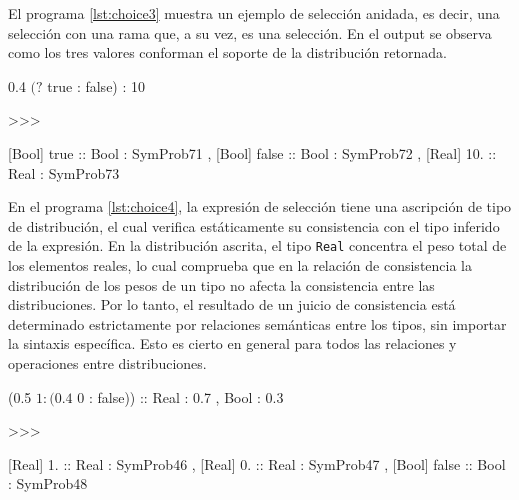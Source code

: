   




El programa \ref{lst:choice3} muestra un ejemplo de selección anidada,
es decir, una selección con una rama que, a su vez,
es una selección. En el output se observa como los
tres valores conforman el soporte de la distribución
retornada.

\begin{gplcblock}[caption={Selección anidada},label={lst:choice3}]
0.4 $ (? $ true : false) : 10

>>>

{
	 [Bool] true :: Bool : SymProb71 ,
	 [Bool] false :: Bool : SymProb72 ,
	 [Real] 10. :: Real : SymProb73 
}  
\end{gplcblock}



En el programa \ref{lst:choice4}, la expresión de selección
tiene una ascripción de tipo de distribución, el cual
verifica estáticamente su consistencia con el tipo
inferido de la expresión. En la distribución ascrita,
el tipo \lstinline|Real| concentra el peso total de los elementos
reales, lo cual comprueba que en la relación de
consistencia la distribución de los pesos de un tipo
no afecta la consistencia entre las distribuciones. Por
lo tanto, el resultado de un juicio de consistencia está
determinado estrictamente por relaciones semánticas entre
los tipos, sin importar la sintaxis específica. Esto es
cierto en general para todos las relaciones y operaciones
entre distribuciones.



\begin{gplcblock}[caption={Selección con ascripción},label={lst:choice4}]
(0.5 $ 1 : (0.4 $ 0 : false)) :: {Real : 0.7 , Bool : 0.3}

>>>

{
	 [Real] 1. :: Real : SymProb46 ,
	 [Real] 0. :: Real : SymProb47 ,
	 [Bool] false :: Bool : SymProb48 
}  
\end{gplcblock}




